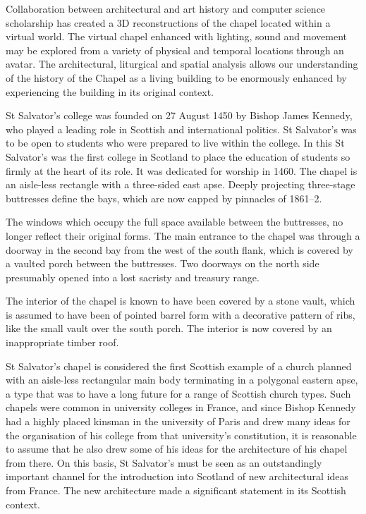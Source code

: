 \documentclass[conference]{acmsiggraph}
\begin{document}
Collaboration between architectural and art history and computer science scholarship has created a 3D reconstructions of the chapel located within a virtual world. The virtual chapel enhanced with lighting, sound and movement may be explored from a variety of physical and temporal locations through an avatar. The architectural, liturgical and spatial analysis allows our understanding of the history of the Chapel as a living building to be enormously enhanced by experiencing the building in its original context.

St Salvator's college was founded on 27 August 1450 by Bishop James Kennedy, who played a leading role in Scottish and international politics. St Salvator’s was to be open to students who were prepared to live within the college. In this St Salvator’s was the first college in Scotland to place the education of students so firmly at the heart of its role. It was dedicated for worship in 1460. The chapel is an aisle-less rectangle with a three-sided east apse. Deeply projecting three-stage buttresses define the bays, which are now capped by pinnacles of 1861–2. 

The windows which occupy the full space available between the buttresses, no longer reflect their original forms. The main entrance to the chapel was through a doorway in the second bay from the west of the south flank, which is covered by a vaulted porch between the buttresses. Two doorways on the north side presumably opened into a lost sacristy and treasury range. 


The interior of the chapel is known to have been covered by a stone vault, which is assumed to have been of pointed barrel form with a decorative pattern of ribs, like the small vault over the south porch. The interior is now covered by an inappropriate timber roof. 

St Salvator’s chapel is considered the first Scottish example of a church planned with an aisle-less rectangular main body terminating in a polygonal eastern apse, a type that was to have a long future for a range of Scottish church types. Such chapels were common in university colleges in France, and since Bishop Kennedy had a highly placed kinsman in the university of Paris and drew many ideas for the organisation of his college from that university’s constitution, it is reasonable to assume that he also drew some of his ideas for the architecture of his chapel from there. On this basis, St Salvator’s must be seen as an outstandingly important channel for the introduction into Scotland of new architectural ideas from France. The new architecture made a significant statement in its Scottish context. 
\end{document}
